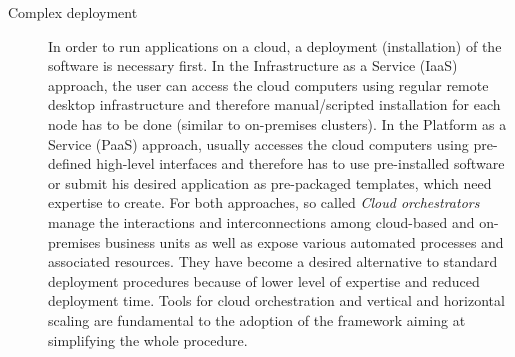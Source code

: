 \documentclass[3p,times]{elsarticle}
\begin{document}
\begin{description}
\item[Complex deployment] In order to run applications on a cloud, a deployment (installation) of the software is necessary first. In the Infrastructure as a Service (IaaS) approach, the user can access the cloud computers using regular remote desktop infrastructure and therefore manual/scripted installation for each node has to be done (similar to on-premises clusters). In the Platform as a Service (PaaS) approach, usually accesses the cloud computers using pre-defined high-level interfaces and therefore has to use pre-installed software or submit his desired application as pre-packaged templates, which need expertise to create. For both approaches, so called \textit{Cloud orchestrators} manage the interactions and interconnections among cloud-based and on-premises business units as well as expose various automated processes and associated resources. They have become a desired alternative to standard deployment procedures because of lower level of expertise and reduced deployment time. Tools for cloud orchestration and vertical and horizontal scaling are fundamental to the adoption of the framework aiming at simplifying the whole procedure.


\end{description}
\end{document}
